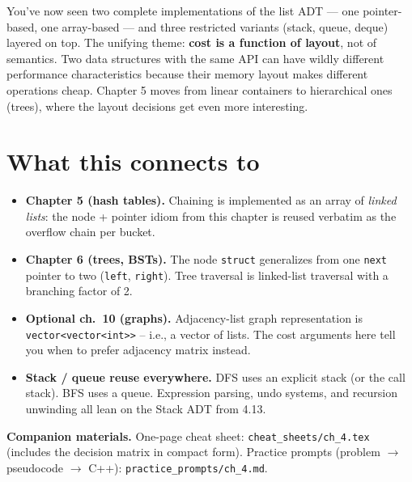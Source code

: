 \documentclass[11pt]{article}
\begin{document}
\begin{ideabox}
You've now seen two complete implementations of the list ADT
--- one pointer-based, one array-based --- and three restricted
variants (stack, queue, deque) layered on top. The unifying
theme: \textbf{cost is a function of layout}, not of semantics.
Two data structures with the same API can have wildly different
performance characteristics because their memory layout makes
different operations cheap. Chapter 5 moves from linear
containers to hierarchical ones (trees), where the layout
decisions get even more interesting.
\end{ideabox}

\section*{What this connects to}

\begin{notebox}
\begin{itemize}
    \item \textbf{Chapter 5 (hash tables).} Chaining is implemented as an
    array of \emph{linked lists}: the node + pointer idiom from this
    chapter is reused verbatim as the overflow chain per bucket.
    \item \textbf{Chapter 6 (trees, BSTs).} The node \texttt{struct}
    generalizes from one \texttt{next} pointer to two (\texttt{left},
    \texttt{right}). Tree traversal is linked-list traversal with a
    branching factor of 2.
    \item \textbf{Optional ch.~10 (graphs).} Adjacency-list graph
    representation is \texttt{vector<vector<int>>} -- i.e., a vector of
    lists. The cost arguments here tell you when to prefer adjacency
    matrix instead.
    \item \textbf{Stack / queue reuse everywhere.} DFS uses an explicit
    stack (or the call stack). BFS uses a queue. Expression parsing, undo
    systems, and recursion unwinding all lean on the Stack ADT from 4.13.
\end{itemize}
\end{notebox}

\textbf{Companion materials.} One-page cheat sheet:
\texttt{cheat\_sheets/ch\_4.tex} (includes the decision matrix in compact
form). Practice prompts (problem $\to$ pseudocode $\to$ C++):
\texttt{practice\_prompts/ch\_4.md}.
\end{document}

